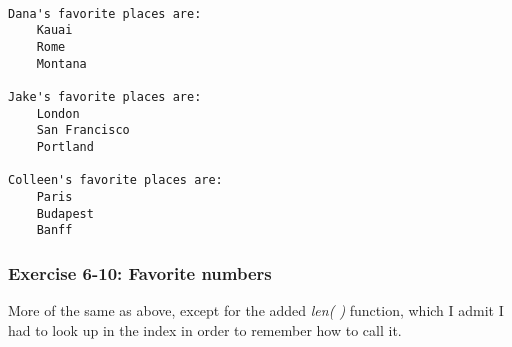 \documentclass[11pt]{article}
\begin{document}
    \begin{Verbatim}[commandchars=\\\{\}]

Dana's favorite places are:
	Kauai
	Rome
	Montana

Jake's favorite places are:
	London
	San Francisco
	Portland

Colleen's favorite places are:
	Paris
	Budapest
	Banff

    \end{Verbatim}

    \subsubsection{Exercise 6-10: Favorite
numbers}\label{exercise-6-10-favorite-numbers}

More of the same as above, except for the added \emph{len( )} function,
which I admit I had to look up in the index in order to remember how to
call it.
\end{document}
